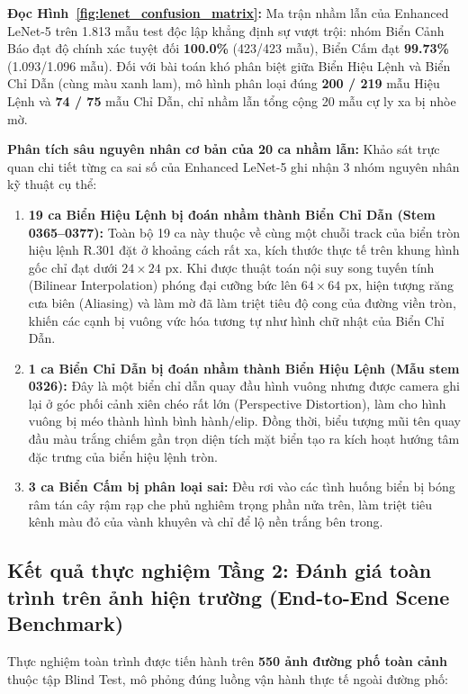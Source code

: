 \textbf{Đọc Hình~\ref{fig:lenet_confusion_matrix}:}
Ma trận nhầm lẫn của Enhanced LeNet-5 trên 1.813 mẫu test độc lập khẳng định sự vượt trội: nhóm Biển Cảnh Báo đạt độ chính xác tuyệt đối \textbf{100.0\%} (423/423 mẫu), Biển Cấm đạt \textbf{99.73\%} (1.093/1.096 mẫu). Đối với bài toán khó phân biệt giữa Biển Hiệu Lệnh và Biển Chỉ Dẫn (cùng màu xanh lam), mô hình phân loại đúng \textbf{200 / 219} mẫu Hiệu Lệnh và \textbf{74 / 75} mẫu Chỉ Dẫn, chỉ nhầm lẫn tổng cộng 20 mẫu cự ly xa bị nhòe mờ.

\textbf{Phân tích sâu nguyên nhân cơ bản của 20 ca nhầm lẫn:}
Khảo sát trực quan chi tiết từng ca sai số của Enhanced LeNet-5 ghi nhận 3 nhóm nguyên nhân kỹ thuật cụ thể:
\begin{enumerate}
    \item \textbf{19 ca Biển Hiệu Lệnh bị đoán nhầm thành Biển Chỉ Dẫn (Stem 0365--0377):} Toàn bộ 19 ca này thuộc về cùng một chuỗi track của biển tròn hiệu lệnh R.301 đặt ở khoảng cách rất xa, kích thước thực tế trên khung hình gốc chỉ đạt dưới $24 \times 24\text{ px}$. Khi được thuật toán nội suy song tuyến tính (Bilinear Interpolation) phóng đại cưỡng bức lên $64 \times 64\text{ px}$, hiện tượng răng cưa biên (Aliasing) và làm mờ đã làm triệt tiêu độ cong của đường viền tròn, khiến các cạnh bị vuông vức hóa tương tự như hình chữ nhật của Biển Chỉ Dẫn.
    \item \textbf{1 ca Biển Chỉ Dẫn bị đoán nhầm thành Biển Hiệu Lệnh (Mẫu stem 0326):} Đây là một biển chỉ dẫn quay đầu hình vuông nhưng được camera ghi lại ở góc phối cảnh xiên chéo rất lớn (Perspective Distortion), làm cho hình vuông bị méo thành hình bình hành/elip. Đồng thời, biểu tượng mũi tên quay đầu màu trắng chiếm gần trọn diện tích mặt biển tạo ra kích hoạt hướng tâm đặc trưng của biển hiệu lệnh tròn.
    \item \textbf{3 ca Biển Cấm bị phân loại sai:} Đều rơi vào các tình huống biển bị bóng râm tán cây rậm rạp che phủ nghiêm trọng phần nửa trên, làm triệt tiêu kênh màu đỏ của vành khuyên và chỉ để lộ nền trắng bên trong.
\end{enumerate}

\subsection{Kết quả thực nghiệm Tầng 2: Đánh giá toàn trình trên ảnh hiện trường (End-to-End Scene Benchmark)}
\label{subsec:benchmark_scene}

Thực nghiệm toàn trình được tiến hành trên \textbf{550 ảnh đường phố toàn cảnh} thuộc tập Blind Test, mô phỏng đúng luồng vận hành thực tế ngoài đường phố:

